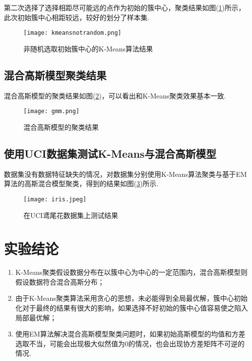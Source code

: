 \documentclass{hitreport}
\begin{document}
第二次选择了选择相距尽可能远的点作为初始的簇中心，聚类结果如图(\ref{fig:fig2})所示，此次初始簇中心相距较远，较好的划分了样本集.

\begin{figure}[htb]
	\centering
		\texttt{[image: kmeansnotrandom.png]}
	\caption{非随机选取初始簇中心的K-Means算法结果}\label{fig:fig2}
\end{figure}

\subsection{混合高斯模型聚类结果}

混合高斯模型的聚类结果如图(\ref{fig:fig3})，可以看出和K-Means聚类效果基本一致.

\begin{figure}[htb]
	\centering
		\texttt{[image: gmm.png]}
	\caption{混合高斯模型的聚类结果}\label{fig:fig3}
\end{figure}

\subsection{使用UCI数据集测试K-Means与混合高斯模型}

数据集没有数据特征缺失的情况，对数据集分别使用K-Means算法聚类与基于EM算法的高斯混合模型聚类，得到的结果如图(\ref{fig:fig4})所示. 

\begin{figure}
	\centering
	\texttt{[image: iris.jpeg]}
	\caption{在UCI鸢尾花数据集上测试结果}\label{fig:fig4}
\end{figure}



\section{实验结论}

\begin{enumerate}
\item K-Means聚类假设数据分布在以簇中心为中心的一定范围内，混合高斯模型则假设数据符合混合高斯分布；
\item 由于K-Means聚类算法采用贪心的思想，未必能得到全局最优解，簇中心初始化对于最终的结果有很大的影响，如果选择不好初始的簇中心值容易使之陷入局部最优解；
\item 使用EM算法解决混合高斯模型聚类问题时，如果初始高斯模型的均值和方差选取不当，可能会出现极大似然值为0的情况，也会出现协方差矩阵不可逆的情况.
\end{enumerate}
\end{document}
